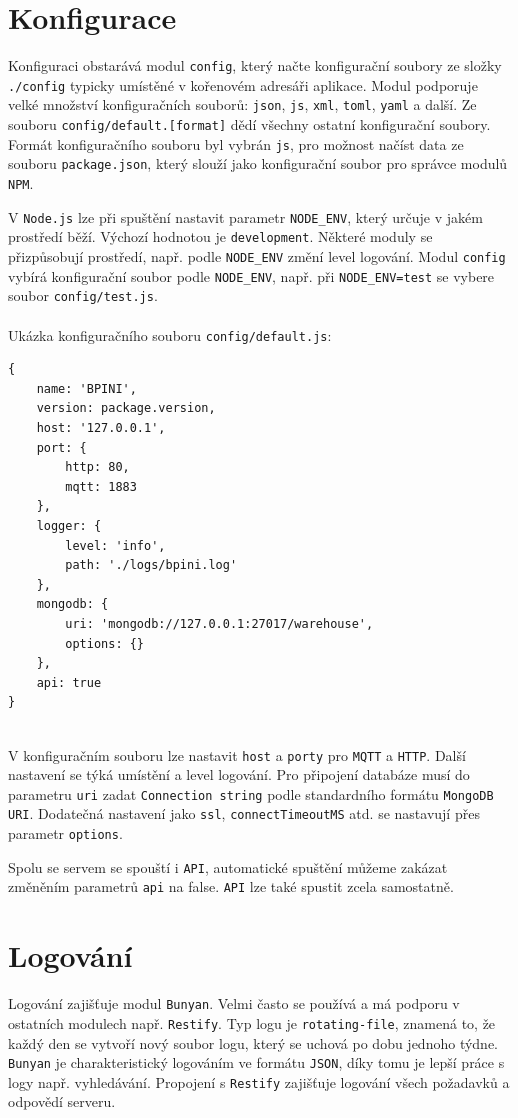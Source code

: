 \documentclass[czech,BP]{thesiskiv}
\begin{document}
	
	
\section{Konfigurace}
		Konfiguraci obstarává modul \texttt{config}, který načte konfigurační soubory ze složky \texttt{./config} typicky umístěné v kořenovém adresáři aplikace. 	
		Modul podporuje velké množství konfiguračních souborů: \texttt{json}, \texttt{js}, \texttt{xml}, \texttt{toml}, \texttt{yaml} a další.
		Ze souboru \texttt{config/default.[format]} dědí všechny ostatní konfigurační soubory.
		Formát konfiguračního souboru byl vybrán \texttt{js}, pro možnost načíst data ze souboru \texttt{package.json}, který slouží jako konfigurační soubor pro správce modulů \texttt{NPM}.	
			
		V \texttt{Node.js} lze při spuštění nastavit parametr \texttt{NODE\_ENV}, který určuje v jakém prostředí běží. Výchozí hodnotou je \texttt{development}.
		Některé moduly se přizpůsobují prostředí, např. podle \texttt{NODE\_ENV} změní level logování. 
		Modul \texttt{config} vybírá konfigurační soubor podle \texttt{NODE\_ENV}, např. při \texttt{NODE\_ENV=test} se vybere soubor \texttt{config/test.js}.
\\\\
		Ukázka konfiguračního souboru \texttt{config/default.js}:	
\begin{verbatim}
{
    name: 'BPINI',
    version: package.version,
    host: '127.0.0.1',
    port: {
        http: 80,
        mqtt: 1883
    },
    logger: {
        level: 'info',
        path: './logs/bpini.log'
    },
    mongodb: {
        uri: 'mongodb://127.0.0.1:27017/warehouse',
        options: {}
    },
    api: true
}
\end{verbatim}
\ \\
	V konfiguračním souboru lze nastavit  \texttt{host} a  \texttt{porty} pro \texttt{MQTT} a \texttt{HTTP}. Další nastavení se týká umístění a level logování. Pro připojení databáze musí do parametru \texttt{uri} zadat \texttt{Connection string} podle standardního formátu \texttt{MongoDB URI}. Dodatečná nastavení jako \texttt{ssl}, \texttt{connectTimeoutMS} atd. se nastavují přes parametr \texttt{options}. 
	
	Spolu se servem se spouští i \texttt{API}, automatické spuštění můžeme zakázat změněním parametrů \texttt{api} na false. \texttt{API} lze také spustit zcela samostatně.	
	
	
	\section{Logování}
	Logování zajišťuje modul \texttt{Bunyan}. Velmi často se používá a má podporu v ostatních modulech např. \texttt{Restify}.
	Typ logu je \texttt{rotating-file}, znamená to, že každý den se vytvoří nový soubor logu, který se uchová po dobu jednoho týdne.
	\texttt{Bunyan} je charakteristický logováním ve formátu \texttt{JSON}, díky tomu je lepší práce s logy např. vyhledávání.
	Propojení s \texttt{Restify} zajišťuje logování všech požadavků a odpovědí serveru. 
	
\end{document}
